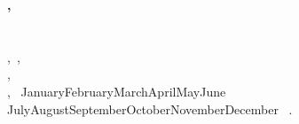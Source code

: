 \thispagestyle{empty}
\vspace*{\fill}
\noindent\textbf{\dcauthorlastname, \dcauthorfirstname}\\
\dcmatriculationnumber\\
\dctitle\\
\dcsubject,~\dcdepart,\\
\dcprof,\\
\dcuni,~\ifcase\month\or
January\or February\or March\or April\or May\or June\or
July\or August\or September\or October\or November\or December\fi
~\number\year.\\


